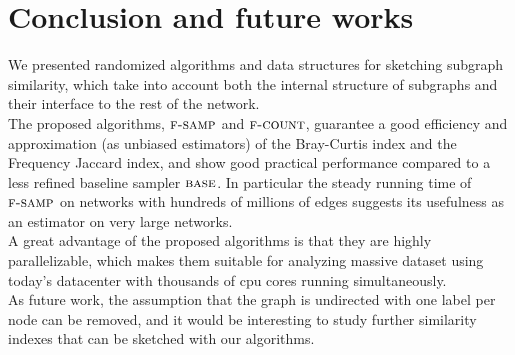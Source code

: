 \chapter{Conclusion and future works}
    

We presented randomized algorithms and data structures for sketching subgraph similarity, 
which take into account both the internal structure of subgraphs and their interface to the rest of the network. \\

The proposed algorithms, $\textsc{f-samp}$ and $\textsc{f-count}$, guarantee a good efficiency and approximation
(as unbiased estimators) of the Bray-Curtis index and the Frequency
Jaccard index, and show good practical performance compared to a
less refined baseline sampler $\textsc{base}$. In particular the steady running time
of $\textsc{f-samp}$ on networks with hundreds of millions of edges suggests
its usefulness as an estimator on very large networks.\\

A great advantage of the proposed algorithms is that they are highly parallelizable,
which makes them suitable for analyzing massive dataset using today's datacenter with 
thousands of cpu cores running simultaneously.\\

As future work, the assumption that the graph is undirected with one label per
node can be removed, and it would be interesting to study further
similarity indexes that can be sketched with our algorithms.